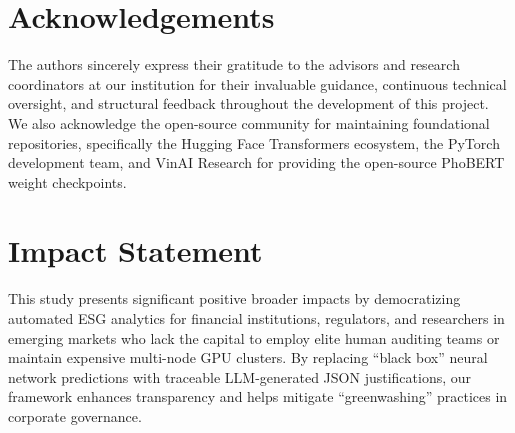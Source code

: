 \documentclass{article}
\theoremstyle{plain}
\theoremstyle{definition}
\theoremstyle{remark}
\begin{document}
\section*{Acknowledgements}
The authors sincerely express their gratitude to the advisors and research coordinators at our institution for their invaluable guidance, continuous technical oversight, and structural feedback throughout the development of this project. We also acknowledge the open-source community for maintaining foundational repositories, specifically the Hugging Face Transformers ecosystem, the PyTorch development team, and VinAI Research for providing the open-source PhoBERT weight checkpoints. 

\begin{center}
\color{red}
\noindent{}
\end{center}

\section*{Impact Statement}
This study presents significant positive broader impacts by democratizing automated ESG analytics for financial institutions, regulators, and researchers in emerging markets who lack the capital to employ elite human auditing teams or maintain expensive multi-node GPU clusters. By replacing ``black box'' neural network predictions with traceable LLM-generated JSON justifications, our framework enhances transparency and helps mitigate ``greenwashing'' practices in corporate governance. 
\end{document}
